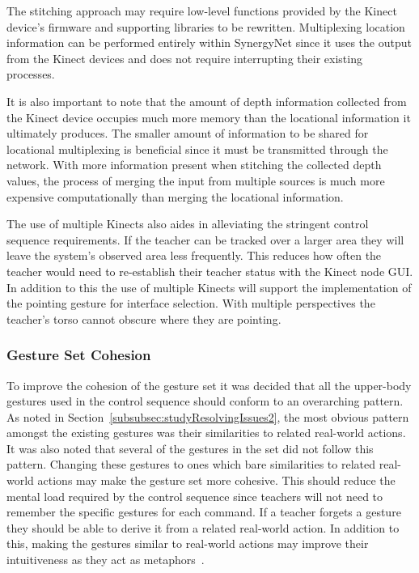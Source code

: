 \documentclass[link]{IWCOMP}
\begin{document}
The stitching approach may require low-level functions provided by the Kinect device's firmware and supporting libraries to be rewritten.
Multiplexing location information can be performed entirely within SynergyNet since it uses the output from the Kinect devices and does not require interrupting their existing processes.

It is also important to note that the amount of depth information collected from the Kinect device occupies much more memory than the locational information it ultimately produces.
The smaller amount of information to be shared for locational multiplexing is beneficial since it must be transmitted through the network.
With more information present when stitching the collected depth values, the process of merging the input from multiple sources is much more expensive computationally than merging the locational information.

The use of multiple Kinects also aides in alleviating the stringent control sequence requirements.
If the teacher can be tracked over a larger area they will leave the system's observed area less frequently.
This reduces how often the teacher would need to re-establish their teacher status with the Kinect node GUI.
In addition to this the use of multiple Kinects will support the implementation of the pointing gesture for interface selection.
With multiple perspectives the teacher's torso cannot obscure where they are pointing.

\subsubsection{Gesture Set Cohesion} 
\label{subsubsec:studyImplementationGestureSet}

To improve the cohesion of the gesture set it was decided that all the upper-body gestures used in the control sequence should conform to an overarching pattern.
As noted in Section~\ref{subsubsec:studyResolvingIssues2}, the most obvious pattern amongst the existing gestures was their similarities to related real-world actions.
It was also noted that several of the gestures in the set did not follow this pattern.
Changing these gestures to ones which bare similarities to related real-world actions may make the gesture set more cohesive.
This should reduce the mental load required by the control sequence since teachers will not need to remember the specific gestures for each command.
If a teacher forgets a gesture they should be able to derive it from a related real-world action.
In addition to this, making the gestures similar to real-world actions may improve their intuitiveness as they act as metaphors~\cite{Wang2008}.
\end{document}
